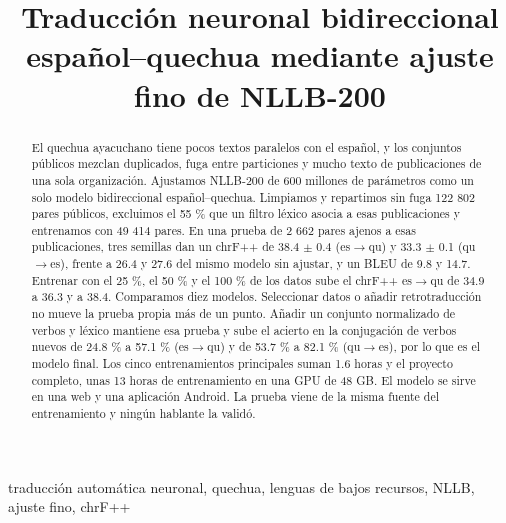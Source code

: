 \documentclass[conference]{IEEEtran}
\begin{document}
\title{Traducción neuronal bidireccional español–quechua mediante ajuste fino de NLLB-200}
\author{
\and
{}
\and
{}
\and
{}
}
\maketitle
\begin{abstract}
El quechua ayacuchano tiene pocos textos paralelos con el español, y los conjuntos públicos mezclan duplicados, fuga entre particiones y mucho texto de publicaciones de una sola organización. Ajustamos NLLB-200 de 600 millones de parámetros como un solo modelo bidireccional español–quechua. Limpiamos y repartimos sin fuga 122 802 pares públicos, excluimos el 55 \% que un filtro léxico asocia a esas publicaciones y entrenamos con 49 414 pares. En una prueba de 2 662 pares ajenos a esas publicaciones, tres semillas dan un chrF++ de 38.4 $\pm$ 0.4 (es$\rightarrow$qu) y 33.3 $\pm$ 0.1 (qu$\rightarrow$es), frente a 26.4 y 27.6 del mismo modelo sin ajustar, y un BLEU de 9.8 y 14.7. Entrenar con el 25 \%, el 50 \% y el 100 \% de los datos sube el chrF++ es$\rightarrow$qu de 34.9 a 36.3 y a 38.4. Comparamos diez modelos. Seleccionar datos o añadir retrotraducción no mueve la prueba propia más de un punto. Añadir un conjunto normalizado de verbos y léxico mantiene esa prueba y sube el acierto en la conjugación de verbos nuevos de 24.8 \% a 57.1 \% (es$\rightarrow$qu) y de 53.7 \% a 82.1 \% (qu$\rightarrow$es), por lo que es el modelo final. Los cinco entrenamientos principales suman 1.6 horas y el proyecto completo, unas 13 horas de entrenamiento en una GPU de 48 GB. El modelo se sirve en una web y una aplicación Android. La prueba viene de la misma fuente del entrenamiento y ningún hablante la validó.
\end{abstract}
\begin{IEEEkeywords}
traducción automática neuronal, quechua, lenguas de bajos recursos, NLLB, ajuste fino, chrF++
\end{IEEEkeywords}
\end{document}
